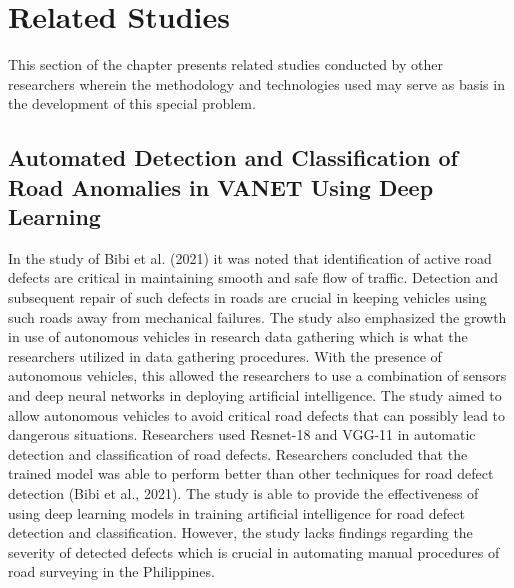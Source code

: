 \documentclass{report} %
\begin{document}
	
	\section{Related Studies}
	This section of the chapter presents related studies conducted by other researchers wherein the methodology and technologies used may serve as basis in the development of this special problem.
	
	\subsection{Automated Detection and Classification of Road Anomalies in VANET Using Deep Learning}
		In the study of Bibi et al. (2021) it was noted that identification of active road defects are critical in maintaining smooth and safe flow of traffic. Detection and subsequent repair of such defects in roads are crucial in keeping vehicles using such roads away from mechanical failures. The study also emphasized the growth in use of autonomous vehicles in research data gathering which is what the researchers utilized in data gathering procedures. With the presence of autonomous vehicles, this allowed the researchers to use a combination of sensors and deep neural networks in deploying artificial intelligence. The study aimed to allow autonomous vehicles to avoid critical road defects that can possibly lead to dangerous situations. Researchers used Resnet-18 and VGG-11 in automatic detection and classification of road defects. Researchers concluded that the trained model was able to perform better than other techniques for road defect detection (Bibi et al., 2021). The study is able to provide the effectiveness of using deep learning models in training artificial intelligence for road defect detection and classification. However, the study lacks findings regarding the severity of detected defects which is crucial in automating manual procedures of road surveying in the Philippines.
	
\end{document}
